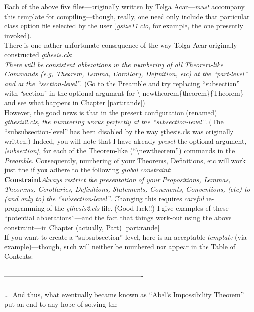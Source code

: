 \documentclass[11pt]{gthesis2}  %
\begin{document}
%
Each of the above five files---originally written by Tolga
Acar---\emph{must} accompany this template for compiling---though,
really, one need only include that particular class option file
selected by the user (\emph{gsize11.clo}, for example, the one
presently invoked).
\\[.3cm]
\indent There is one rather unfortunate consequence of the way
Tolga Acar originally constructed  \emph{gthesis.cls}:
\\[.3cm]
\emph{There will be consistent abberations in the numbering of all
Theorem-like Commands (e.g, Theorem, Lemma, Corollary, Definition,
etc) at the ``part-level'' and at the ``section-level''}. (Go to
the Preamble and try replacing ``subsection'' with ``section'' in
the optional argument for \textbackslash
newtheorem\{theorem\}\{Theorem\} and see what happens in Chapter
\ref{part:rande})
\\[.3cm]
However, the good news is that in the present configuration
(renamed) \emph{gthesis2.cls}, \emph{the numbering works perfectly
at the ``subsection-level''}. (The ``subsubsection-level'' has
been disabled by the way gthesis.cls was originally written.)
Indeed, you will note that I have already \emph{preset} the
optional argument, \emph{[subsection]}, for each of the
Theorem-like (``\textbackslash newtheorem'') commands in the
\emph{Preamble}. Consequently, numbering of your Theorems,
Definitions, etc will work just fine if you adhere to the
following \emph{global constraint}: 
\\[.4cm]
\textbf{Constraint}\;\;\emph{Always restrict the presentation of
your Propositions, Lemmas, Theorems, Corollaries, Definitions,
Statements, Comments, Conventions, (etc) to (and only to) the
``subsection-level''}.
%
\newpage
%
Changing this requires \emph{careful} re-programming of the
\emph{gthesis2.cls} file. (Good luck!!) I give examples of these
``potential abberations''---and the fact that things work-out
using the above constraint---in Chapter (actually, Part)
\ref{part:rande}
\\[.6cm]
If you want to create a ``subsubsection'' level, here is an
acceptable \emph{template} (via example)---though, such will
neither be numbered nor appear in the Table of Contents:
\\\\
-------------------------------------------------------------
\\\\
%
\dots\, And thus, what eventually became known as ``Abel's
Impossibility Theorem'' put an end to any hope of solving the
\end{document}
